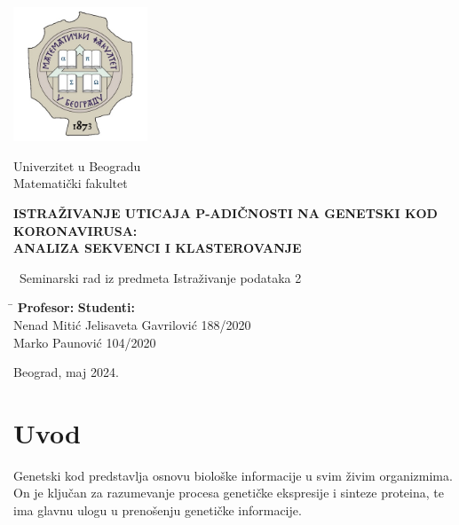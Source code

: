 \documentclass[a4paper,12pt]{article}
\begin{document}
\begin{titlepage}
    \centering
    
    \includegraphics[width=0.3\textwidth]{matematickiFakultet.jpeg}\par
    
    Univerzitet u Beogradu\\ Matematički fakultet
    
    \vspace{2cm}
    
    \textbf{\Large ISTRAŽIVANJE UTICAJA P-ADIČNOSTI NA GENETSKI KOD KORONAVIRUSA: \\ \vspace{0.5cm} ANALIZA SEKVENCI I KLASTEROVANJE}
    
    \vspace{0.5cm}
    
    \ Seminarski rad iz predmeta Istraživanje podataka 2
    
    \vfill
    
    \begin{tabbing}
        \hspace{8cm} \= \kill
        \large \textbf{Profesor:} \> \large \textbf{Studenti:} \\
        \large Nenad Mitić \> \large Jelisaveta Gavrilović 188/2020 \\
        \> \large Marko Paunović 104/2020
    \end{tabbing}
    
    \vspace{0.5cm}
    \large Beograd, maj 2024.
    
\end{titlepage}
\newpage

\tableofcontents
\newpage

\section{Uvod}
Genetski kod predstavlja osnovu biološke informacije u svim živim organizmima. On je ključan za 
razumevanje procesa genetičke ekspresije i sinteze proteina, te ima glavnu ulogu u 
prenošenju genetičke informacije. 
\end{document}
